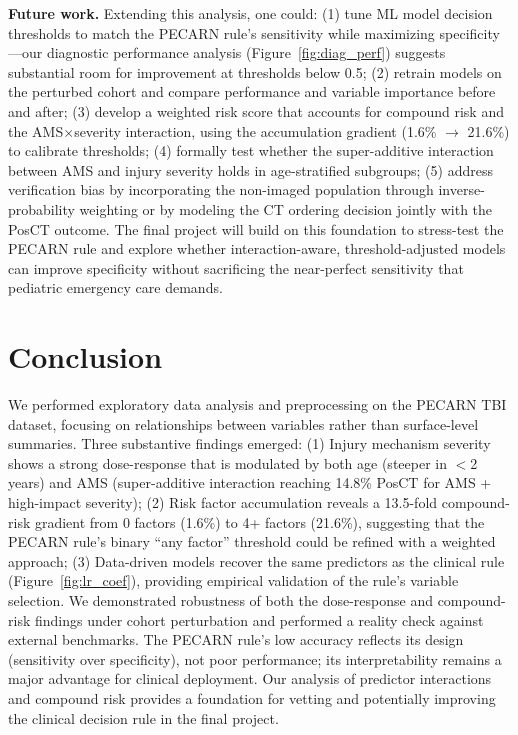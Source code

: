 \documentclass[12ptpt,letterpaper]{article}
\begin{document}
\textbf{Future work.} Extending this analysis, one could: (1) tune ML model decision thresholds to match the PECARN rule's sensitivity while maximizing specificity---our diagnostic performance analysis (Figure~\ref{fig:diag_perf}) suggests substantial room for improvement at thresholds below 0.5; (2) retrain models on the perturbed cohort and compare performance and variable importance before and after; (3) develop a weighted risk score that accounts for compound risk and the AMS$\times$severity interaction, using the accumulation gradient (1.6\% $\to$ 21.6\%) to calibrate thresholds; (4) formally test whether the super-additive interaction between AMS and injury severity holds in age-stratified subgroups; (5) address verification bias by incorporating the non-imaged population through inverse-probability weighting or by modeling the CT ordering decision jointly with the PosCT outcome. The final project will build on this foundation to stress-test the PECARN rule and explore whether interaction-aware, threshold-adjusted models can improve specificity without sacrificing the near-perfect sensitivity that pediatric emergency care demands.


\section{Conclusion}\label{conclusion}

We performed exploratory data analysis and preprocessing on the PECARN TBI dataset, focusing on relationships between variables rather than surface-level summaries. Three substantive findings emerged: (1) Injury mechanism severity shows a strong dose-response that is modulated by both age (steeper in $<$2 years) and AMS (super-additive interaction reaching 14.8\% PosCT for AMS + high-impact severity); (2) Risk factor accumulation reveals a 13.5-fold compound-risk gradient from 0 factors (1.6\%) to 4+ factors (21.6\%), suggesting that the PECARN rule's binary ``any factor'' threshold could be refined with a weighted approach; (3) Data-driven models recover the same predictors as the clinical rule (Figure~\ref{fig:lr_coef}), providing empirical validation of the rule's variable selection. We demonstrated robustness of both the dose-response and compound-risk findings under cohort perturbation and performed a reality check against external benchmarks. The PECARN rule's low accuracy reflects its design (sensitivity over specificity), not poor performance; its interpretability remains a major advantage for clinical deployment. Our analysis of predictor interactions and compound risk provides a foundation for vetting and potentially improving the clinical decision rule in the final project.
\end{document}
